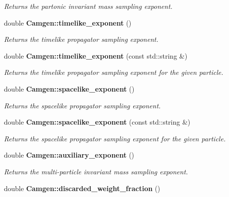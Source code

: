 \begin{DoxyCompactItemize}
\begin{DoxyCompactList}\small\item\em Returns the partonic invariant mass sampling exponent. \end{DoxyCompactList}\item 
\hypertarget{a00849_aca68996421ae280ada5d9bf6966e9857}{double {\bfseries Camgen\-::timelike\-\_\-exponent} ()}\label{a00849_aca68996421ae280ada5d9bf6966e9857}

\begin{DoxyCompactList}\small\item\em Returns the timelike propagator sampling exponent. \end{DoxyCompactList}\item 
double {\bfseries Camgen\-::timelike\-\_\-exponent} (const std\-::string \&)
\begin{DoxyCompactList}\small\item\em Returns the timelike propagator sampling exponent for the given particle. \end{DoxyCompactList}\item 
\hypertarget{a00849_a64fc037fbef0f6cb7bb1771eef05dc9f}{double {\bfseries Camgen\-::spacelike\-\_\-exponent} ()}\label{a00849_a64fc037fbef0f6cb7bb1771eef05dc9f}

\begin{DoxyCompactList}\small\item\em Returns the spacelike propagator sampling exponent. \end{DoxyCompactList}\item 
double {\bfseries Camgen\-::spacelike\-\_\-exponent} (const std\-::string \&)
\begin{DoxyCompactList}\small\item\em Returns the spacelike propagator sampling exponent for the given particle. \end{DoxyCompactList}\item 
\hypertarget{a00849_ab4ad02e88ed91b81dc8a95c9c8f2d587}{double {\bfseries Camgen\-::auxiliary\-\_\-exponent} ()}\label{a00849_ab4ad02e88ed91b81dc8a95c9c8f2d587}

\begin{DoxyCompactList}\small\item\em Returns the multi-\/particle invariant mass sampling exponent. \end{DoxyCompactList}\item 
\hypertarget{a00849_ab0a5373efc296afd16509ef6bb82601e}{double {\bfseries Camgen\-::discarded\-\_\-weight\-\_\-fraction} ()}\label{a00849_ab0a5373efc296afd16509ef6bb82601e}


\end{DoxyCompactItemize}
